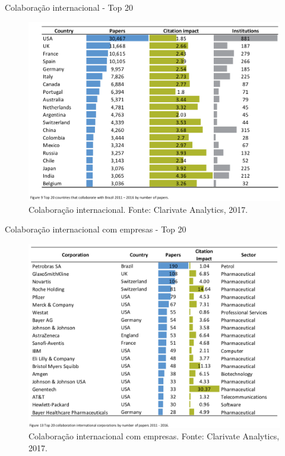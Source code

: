 \begin{frame}{Colaboração internacional - Top 20}
\begin{figure}
\centering
\includegraphics[scale=0.25]{figs/01/panorama-top20}
\caption{\scriptsize{Colaboração internacional. Fonte: Clarivate Analytics, 2017.}}
\end{figure}
\end{frame}

\begin{frame}{Colaboração internacional com empresas - Top 20}
\begin{figure}
\centering
\includegraphics[scale=0.25]{figs/01/panorama-top20-papers}
\caption{\scriptsize{Colaboração internacional com empresas. Fonte: Clarivate Analytics, 2017.}}
\end{figure}
\end{frame}

